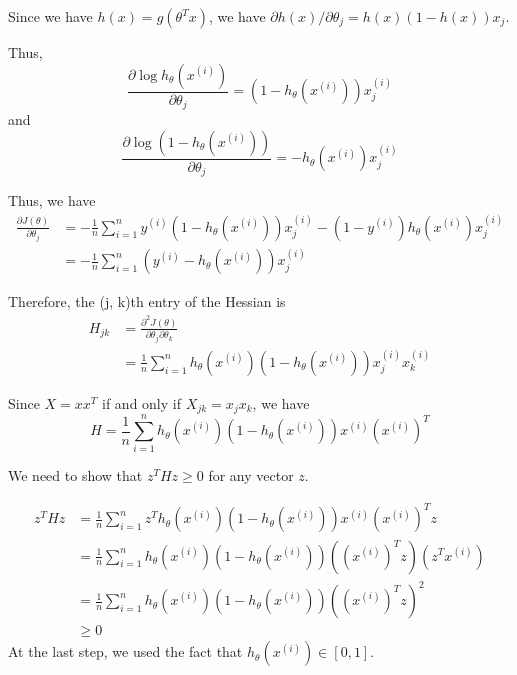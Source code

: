 \begin{answer}
    Since we have $h(x) = g(\theta^T x)$, we have 
    $\partial h(x) / \partial \theta_j = h(x) (1 - h(x)) x_j$.

    Thus,
    $$
        \frac{\partial \log h_\theta(x^{(i)})}{\partial \theta_j} = (1 - h_\theta(x^{(i)})) x_j^{(i)}
    $$
    and
    $$
        \frac{\partial \log (1 - h_\theta(x^{(i)}))}{\partial \theta_j} = - h_\theta(x^{(i)}) x_j^{(i)}
    $$

    Thus, we have
    \begin{align*}
        \frac{\partial J(\theta)}{\partial \theta_j} &= - \frac{1}{n} \sum_{i = 1}^{n} y^{(i)} (1 - h_\theta(x^{(i)})) x_j^{(i)} - (1 - y^{(i)}) h_\theta(x^{(i)}) x_j^{(i)} \\
        &= - \frac{1}{n} \sum_{i = 1}^{n} (y^{(i)} - h_\theta(x^{(i)})) x_j^{(i)}
    \end{align*}

    Therefore, the (j, k)th entry of the Hessian is
    \begin{align*}
        H_{jk} &= \frac{\partial^2 J(\theta)}{\partial \theta_j \partial \theta_k} \\
        &= \frac{1}{n} \sum_{i = 1}^{n} h_\theta(x^{(i)}) (1 - h_\theta(x^{(i)})) x_j^{(i)} x_k^{(i)}
    \end{align*}

    Since $X = x x^T$ if and only if $X_{jk} = x_j x_k$, we have
    $$
        H = \frac{1}{n} \sum_{i = 1}^{n} h_\theta(x^{(i)}) (1 - h_\theta(x^{(i)})) x^{(i)} (x^{(i)})^T
    $$

    We need to show that $z^T H z \geq 0$ for any vector $z$.

    \begin{align*}
        z^T H z &= \frac{1}{n} \sum_{i = 1}^{n} z^T h_\theta(x^{(i)}) (1 - h_\theta(x^{(i)})) x^{(i)} (x^{(i)})^T z \\
        &= \frac{1}{n} \sum_{i = 1}^{n} h_\theta(x^{(i)}) (1 - h_\theta(x^{(i)})) ((x^{(i)})^T z) (z^T x^{(i)}) \\
        &= \frac{1}{n} \sum_{i = 1}^{n} h_\theta(x^{(i)}) (1 - h_\theta(x^{(i)})) ((x^{(i)})^T z)^2 \\
        &\geq 0
    \end{align*}
    At the last step, we used the fact that $h_\theta(x^{(i)}) \in [0, 1]$.
\end{answer}
